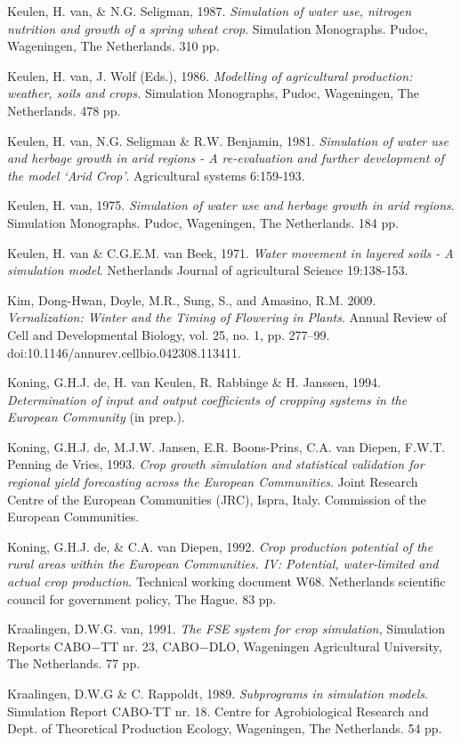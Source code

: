 Keulen, H. van, \& N.G. Seligman, 1987. {\it Simulation of water use, nitrogen nutrition and growth of
a spring wheat crop\/}. Simulation Monographs. Pudoc, Wageningen, The Netherlands. 310 pp.

Keulen, H. van, J. Wolf (Eds.), 1986. {\it Modelling of agricultural production: weather, soils and
crops.\/} Simulation Monographs, Pudoc, Wageningen, The Netherlands. 478 pp. 

Keulen, H. van, N.G. Seligman \& R.W. Benjamin, 1981. {\it Simula\-tion of water use and herbage
growth in arid\/} {\it regions - A re-evaluation and further development of the model `Arid Crop'\/}.
Agricultural systems 6:159-193.

Keulen, H. van, 1975. {\it Simulation of water use and herbage growth in arid regions\/}. Simulation
Monographs. Pudoc, Wageningen, The Netherlands. 184 pp.

Keulen, H. van \& C.G.E.M. van Beek, 1971. {\it Water movement in layered soils - A simulation model\/}.
Netherlands Journal of agricultural Science 19:138-153.

Kim, Dong-Hwan, Doyle, M.R., Sung, S., and Amasino, R.M. 2009.
\textit{Vernalization: Winter and the Timing of Flowering in Plants}. Annual Review of Cell and Developmental Biology, 
vol. 25, no. 1, pp. 277–99. doi:10.1146/annurev.cellbio.042308.113411.

Koning, G.H.J. de, H. van Keulen, R. Rabbinge \& H. Janssen, 1994. {\it Determination of input and
output coefficients of cropping systems in the European Community\/} (in prep.).

Koning, G.H.J. de, M.J.W. Jansen, E.R. Boons-Prins, C.A. van Diepen, F.W.T. Penning de Vries,
1993. {\it Crop growth simulation and statistical validation for regional yield forecasting across the
European Communities\/}. Joint Research Centre of the European Communities (JRC), Ispra, Italy.
Commission of the European Communities.

Koning, G.H.J. de, \& C.A. van Diepen, 1992. {\it Crop production potential of the rural areas within
the European Commun\-ities. IV: Potential, water-limited and actual crop production\/}. Technical
working document W68. Netherlands scientific council for government policy, The Hague. 83 pp.

Kraalingen, D.W.G. van, 1991. {\it The FSE system for crop simulation,\/} Simulation Reports CABO$-$TT
nr. 23, CABO$-$DLO, Wageningen Agricultural University, The Netherlands. 77 pp. 

Kraalingen, D.W.G \& C. Rappoldt, 1989. {\it Subprograms in simulation models\/}. Simulation Report
CABO-TT nr. 18. Centre for Agrobiological Research and Dept. of Theoretical Production Ecology,
Wageningen, The Netherlands. 54 pp.

